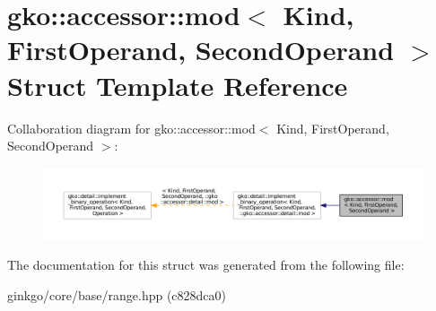 \hypertarget{structgko_1_1accessor_1_1mod}{}\section{gko\+:\+:accessor\+:\+:mod$<$ Kind, First\+Operand, Second\+Operand $>$ Struct Template Reference}
\label{structgko_1_1accessor_1_1mod}


Collaboration diagram for gko\+:\+:accessor\+:\+:mod$<$ Kind, First\+Operand, Second\+Operand $>$\+:
\nopagebreak
\begin{figure}[H]
\begin{center}
\leavevmode
\includegraphics[width=350pt]{structgko_1_1accessor_1_1mod__coll__graph}
\end{center}
\end{figure}


The documentation for this struct was generated from the following file\+:\begin{DoxyCompactItemize}
\item 
ginkgo/core/base/range.\+hpp (c828dca0)\end{DoxyCompactItemize}
